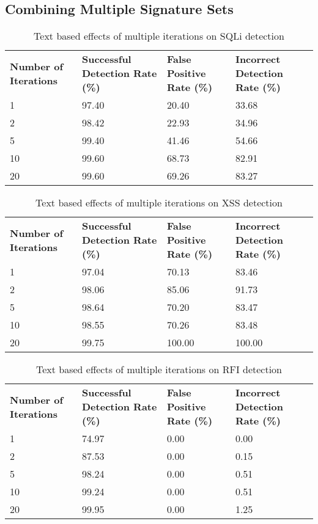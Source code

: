 \begin{appendices}
\newpage
\section{Combining Multiple Signature Sets}

\begin{table}[h]
	\centering
	\begin{tabular}{|p{1.5in}|p{1in}|p{1in}|p{1in}|}
	\hline
	\textbf{Number of Iterations} & \textbf{Successful Detection Rate (\%)} & \textbf{False Positive Rate (\%)} & \textbf{Incorrect Detection Rate (\%)}  \\
	\hhline{|=|=|=|=|}
	1 & 97.40 & 20.40 & 33.68 \\
	\hline
	2 & 98.42 & 22.93 & 34.96 \\
	\hline
	5 & 99.40 & 41.46 & 54.66 \\
	\hline
	10 & 99.60 & 68.73 & 82.91 \\
	\hline
	20 & 99.60 & 69.26 & 83.27 \\
	\hline
	\end{tabular}
	\caption[]{Text based effects of multiple iterations on SQLi detection}
	\label{app:sqlIterationText}
\end{table}

\begin{table}[h]
	\centering
	\begin{tabular}{|p{1.5in}|p{1in}|p{1in}|p{1in}|}
	\hline
	\textbf{Number of Iterations} & \textbf{Successful Detection Rate (\%)} & \textbf{False Positive Rate (\%)} & \textbf{Incorrect Detection Rate (\%)}  \\
	\hhline{|=|=|=|=|}
	1 & 97.04 & 70.13 & 83.46 \\
	\hline
	2 & 98.06 & 85.06 & 91.73 \\
	\hline
	5 & 98.64 & 70.20 & 83.47 \\
	\hline
	10 & 98.55 & 70.26 & 83.48 \\
	\hline
	20 & 99.75 & 100.00 & 100.00 \\
	\hline
	\end{tabular}
	\caption[]{Text based effects of multiple iterations on XSS detection}
	\label{app:xssIterationText}
\end{table}

\begin{table}[h]
	\centering
	\begin{tabular}{|p{1.5in}|p{1in}|p{1in}|p{1in}|}
	\hline
	\textbf{Number of Iterations} & \textbf{Successful Detection Rate (\%)} & \textbf{False Positive Rate (\%)} & \textbf{Incorrect Detection Rate (\%)}  \\
	\hhline{|=|=|=|=|}
	1 & 74.97 & 0.00 & 0.00 \\
	\hline
	2 & 87.53 & 0.00 & 0.15 \\
	\hline
	5 & 98.24 & 0.00 & 0.51 \\
	\hline
	10 & 99.24 & 0.00 & 0.51 \\
	\hline
	20 & 99.95 & 0.00 & 1.25 \\
	\hline
	\end{tabular}
	\caption[]{Text based effects of multiple iterations on RFI detection}
	\label{app:rfiIterationText}
\end{table}


\end{appendices}
